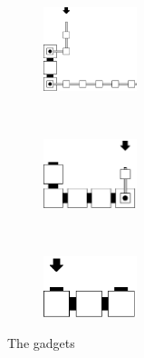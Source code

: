 \begin{figure}[H]
    \begin{subfigure}[t]{0.3\textwidth}
        \centering
        \includegraphics[width=0.3\textwidth]{return_paths_read_next_3_op-or-seed_msr_msd}
        \caption{\label{fig:read_next_3_oporseed_msr_msd}}
    \end{subfigure}%
    ~
    \begin{subfigure}[t]{0.3\textwidth}
        \centering
        \includegraphics[width=0.3\textwidth]{return_paths_read_next_3_seed}
        \caption{\label{fig:read_next_3_seed}}
    \end{subfigure}%
    ~
    \begin{subfigure}[t]{0.3\textwidth}
        \centering
        \includegraphics[width=0.3\textwidth]{return_paths_read_next_2_seed}
        \caption{\label{fig:read_next_2_seed}}
    \end{subfigure}%
    \caption{\label{fig:readnext} The {\readnext} gadgets}
\end{figure}

